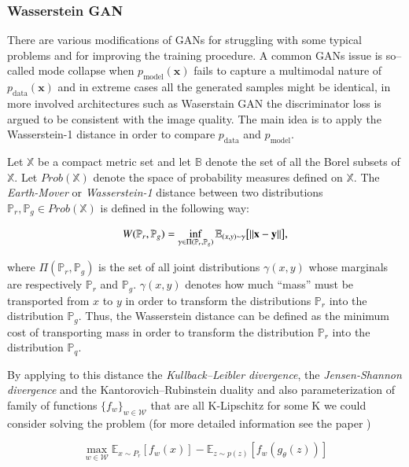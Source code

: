 \documentclass{webofc}
\newcommand{\vx}{\mathbf{x}}
\newcommand{\pdata}{\ensuremath{p_{\text{data}}}}
\begin{document}
\subsubsection{Wasserstein GAN}
There are various modifications of GANs for struggling with some typical problems and for improving the training procedure. A common GANs issue is so--called mode collapse when $p_\text{model} (\vx)$ fails to capture a multimodal nature of $\pdata(\vx)$ and in extreme cases all the generated samples might be identical, in more involved architectures such as Waserstain GAN \cite{arjovsky2017wasserstein} the discriminator loss is argued to be consistent with the image quality. The main idea is to apply the Wasserstein-1 distance in order to compare $\pdata$ and $p_{\text{model}}$.

Let $\mathbb{X}$ be a compact metric set and let $\mathbb{B}$ denote the set of all the Borel subsets of $\mathbb{X}$. Let $Prob(\mathbb{X})$ denote the space of probability measures defined on $\mathbb{X}$. The \emph{Earth-Mover} or \emph{Wasserstein-1} distance between two distributions $\mathbb{P}_r, \mathbb{P}_g \in Prob(\mathbb{X})$ is defined in the following way:

\begin{equation}\label{wasserstein_metric}
W(\mathbb{P}_r, \mathbb{P}_g) = \inf_{\gamma \in \Pi(\mathbb{P}_r, \mathbb{P}_g)} \mathbb{E}_{(x, y) \sim \gamma} \big{[}\|\vx-\textbf{y}\|\big{]},
\end{equation}

where $\Pi(\mathbb{P}_r, \mathbb{P}_g)$ is the set of all joint distributions $\gamma(x, y)$ whose marginals are respectively $\mathbb{P}_r$ and $\mathbb{P}_g$. $\gamma(x, y)$ denotes how much “mass” must be transported from $x$ to $y$ in order to transform the distributions $\mathbb{P}_r$ into the distribution $\mathbb{P}_g$. Thus, the Wasserstein distance can be defined as the minimum cost of transporting mass in order to transform the distribution $\mathbb{P}_r$ into the distribution $\mathbb{P}_q$. 

By applying to this distance the \emph{Kullback--Leibler divergence}, the \emph{Jensen-Shannon divergence} and the Kantorovich--Rubinstein duality and also parameterization of family of functions $\{f_w\}_{w \in \mathcal{W}}$ that are all K-Lipschitz for some K we could consider solving the problem (for more detailed information see the paper \cite{arjovsky2017wasserstein})

\begin{equation}\label{optim}
\max_{w \in \mathcal{W}} \mathbb{E}_{x \sim P_r}[f_w(x)] - \mathbb{E}_{z\sim p(z)} [f_w(g_\theta(z))]
\end{equation}
\end{document}
